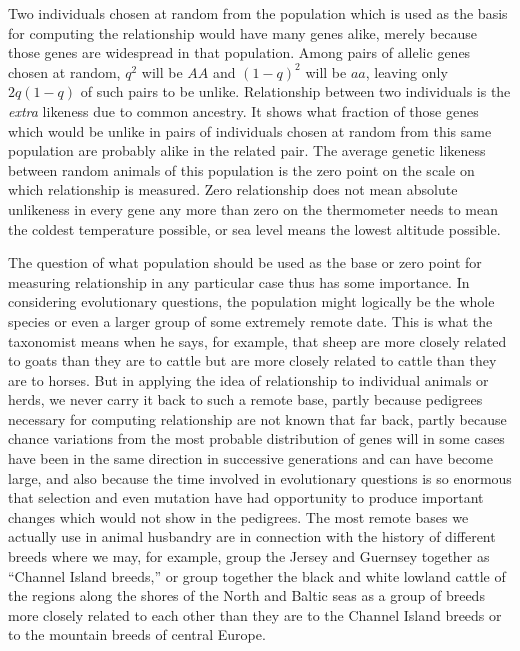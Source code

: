 Two individuals chosen at random from the population which is
used as the basis for computing the relationship would have many
genes alike, merely because those genes are widespread in that population.
Among pairs of allelic genes chosen at random, $q^2$ will be $AA$ and
$(1 - q)^2$ will be $aa$, leaving only $2q (1 - q)$ of such pairs to be unlike.
Relationship between two individuals is the \textit{extra} likeness due to common
ancestry. It shows what fraction of those genes which would be
unlike in pairs of individuals chosen at random from this same population
are probably alike in the related pair. The average genetic likeness
between random animals of this population is the zero point on the
scale on which relationship is measured. Zero relationship does not
mean absolute unlikeness in every gene any more than zero on the thermometer
needs to mean the coldest temperature possible, or sea level
means the lowest altitude possible.

The question of what population should be used as the base or zero
point for measuring relationship in any particular case thus has some
importance. In considering evolutionary questions, the population
might logically be the whole species or even a larger group of some
extremely remote date. This is what the taxonomist means when he
says, for example, that sheep are more closely related to goats than they
are to cattle but are more closely related to cattle than they are to
horses. But in applying the idea of relationship to individual animals
or herds, we never carry it back to such a remote base, partly because
pedigrees necessary for computing relationship are not known that far
back, partly because chance variations from the most probable distribution
of genes will in some cases have been in the same direction in successive
generations and can have become large, and also because the
time involved in evolutionary questions is so enormous that selection
and even mutation have had opportunity to produce important changes
which would not show in the pedigrees. The most remote bases we
actually use in animal husbandry are in connection with the history of
different breeds where we may, for example, group the Jersey and
Guernsey together as ``Channel Island breeds,'' or group together the
black and white lowland cattle of the regions along the shores of the
North and Baltic seas as a group of breeds more closely related to each
other than they are to the Channel Island breeds or to the mountain
breeds of central Europe.

